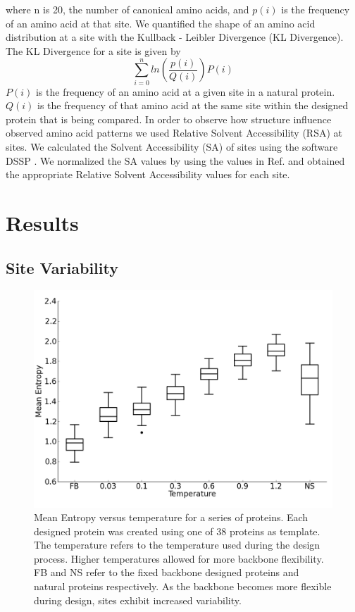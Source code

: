\documentclass[12pt]{article}
\begin{document}
where n is 20, the number of canonical amino acids, and $p(i)$ is the frequency of an amino acid at that site. 
We quantified the shape of an amino acid distribution at a site with the Kullback - Leibler Divergence (KL Divergence). 
The KL Divergence for a site is given by
	$$ \sum_{i=0}^nln  \left({\frac{p(i)}{Q(i)}}\right) P\left(i\right) $$
$P(i)$ is the frequency of an amino acid at a given site in a natural protein. $Q(i)$ is the frequency of that amino acid at the same site within the designed protein that is being compared.
In order to observe how structure influence observed amino acid patterns we used Relative Solvent Accessibility (RSA) at sites. We calculated the Solvent Accessibility (SA) of sites using the software DSSP \cite{Kabsch1983}. We normalized the SA values by using the values in Ref. \cite{Tien} and obtained the appropriate Relative Solvent Accessibility values for each site. 

\section{Results}
\label{Results}

\subsection{Site Variability}
\label{SiteVariability}
\begin{figure}[H]
\centerline{\includegraphics[width = 6in]{figures/Mean_Entropy_vs_Temp_Boxplot.png}}
\caption{Mean Entropy versus temperature for a series of proteins. Each designed protein was created using one of 38 proteins as template. The temperature refers to the temperature used during the design process. Higher temperatures allowed for more backbone flexibility. FB and NS refer to the fixed backbone designed proteins and natural proteins respectively.  As the backbone becomes more flexible during design, sites exhibit increased variability.}
\label{SiteVarFig1}
\end{figure}
\end{document}
